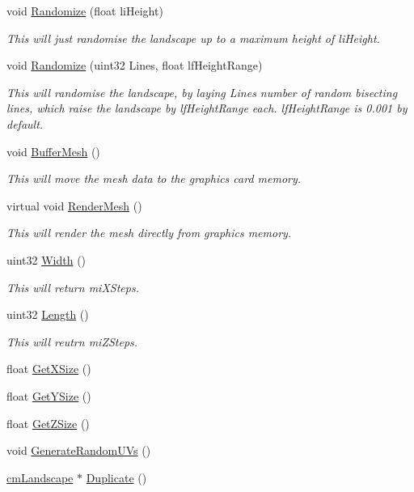 \begin{DoxyCompactItemize}
void \hyperlink{classcm_landscape_a3196745ccd7e5d3f37463602732180c2}{Randomize} (float liHeight)
\begin{DoxyCompactList}\small\item\em This will just randomise the landscape up to a maximum height of liHeight. \item\end{DoxyCompactList}\item 
void \hyperlink{classcm_landscape_a09446d68d55f92099236f2773ab24828}{Randomize} (uint32 Lines, float lfHeightRange)
\begin{DoxyCompactList}\small\item\em This will randomise the landscape, by laying Lines number of random bisecting lines, which raise the landscape by lfHeightRange each. lfHeightRange is 0.001 by default. \item\end{DoxyCompactList}\item 
void \hyperlink{classcm_landscape_af71af80653f52a4a355386f677f1fdc2}{BufferMesh} ()
\begin{DoxyCompactList}\small\item\em This will move the mesh data to the graphics card memory. \item\end{DoxyCompactList}\item 
virtual void \hyperlink{classcm_landscape_a304304d5d539e75b48fb99c0e71d595a}{RenderMesh} ()
\begin{DoxyCompactList}\small\item\em This will render the mesh directly from graphics memory. \item\end{DoxyCompactList}\item 
uint32 \hyperlink{classcm_landscape_ab6cabac9d07c5eedbbc7ac486923c8a5}{Width} ()
\begin{DoxyCompactList}\small\item\em This will return miXSteps. \item\end{DoxyCompactList}\item 
uint32 \hyperlink{classcm_landscape_a52b5ec340ef68b2a601fdca23607c3db}{Length} ()
\begin{DoxyCompactList}\small\item\em This will reutrn miZSteps. \item\end{DoxyCompactList}\item 
float \hyperlink{classcm_landscape_a5032d739a15259c62db86f4de3594e0f}{GetXSize} ()
\item 
float \hyperlink{classcm_landscape_a6366dbfe55b2be8ed19105cbb1855002}{GetYSize} ()
\item 
float \hyperlink{classcm_landscape_a9e8967f6da8ac335917f9046d17ab120}{GetZSize} ()
\item 
void \hyperlink{classcm_landscape_af48d68610953226befe86f0b2b50a641}{GenerateRandomUVs} ()
\item 
\hyperlink{classcm_landscape}{cmLandscape} $\ast$ \hyperlink{classcm_landscape_a13c9bcff2a7b3db7dbad70990be14b34}{Duplicate} ()
\end{DoxyCompactItemize}
